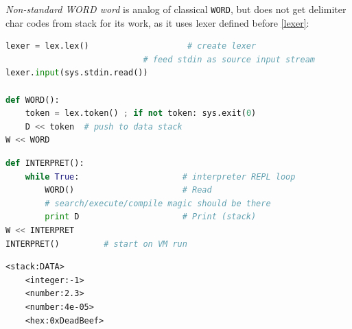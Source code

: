 \emph{Non-standard WORD word} is analog of classical \verb|WORD|, but does not
get delimiter char codes from stack for its work, as it uses lexer
defined before \ref{lexer}:
\begin{lstlisting}[language=Python]
lexer = lex.lex()              		 # create lexer
							# feed stdin as source input stream
lexer.input(sys.stdin.read())

def WORD():
	token = lex.token() ; if not token: sys.exit(0)
	D << token	# push to data stack
W << WORD
\end{lstlisting}
\clearpage\noindent
\begin{lstlisting}[language=Python]
def INTERPRET():
    while True:						# interpreter REPL loop
        WORD()						# Read
		# search/execute/compile magic should be there
        print D						# Print (stack)
W << INTERPRET
INTERPRET()			# start on VM run
\end{lstlisting}
\begin{lstlisting}
<stack:DATA>
	<integer:-1>
	<number:2.3>
	<number:4e-05>
	<hex:0xDeadBeef>
\end{lstlisting}